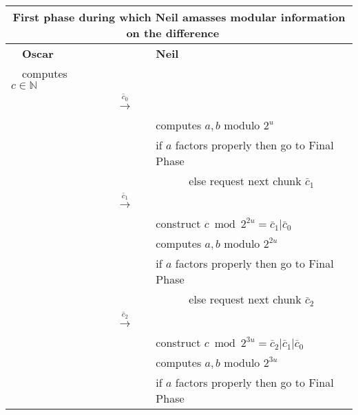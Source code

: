 \documentclass[11pt]{llncs}
\begin{document}
\begin{center}
\begin{tabular}{|lcl|}\hline
\multicolumn{3}{|c|}{{\sf First phase during which Neil amasses modular information on the difference~~}} \\\hline
~~{\bf Oscar}                      &                                                      &   {\bf Neil}~\\
~~computes $c\in \mathbb{N}$       &                                                      &\\
                                   &~~{{\LARGE $\stackrel{\bar{c}_0}{\longrightarrow}$}}~~&   \\
                                   &                                                      &computes $a,b$ modulo $2^u$~\\
                                   &                                                      &if $a$ factors properly then go to {\sf Final Phase}~~\\
                                   &                                                      &~~~~~~else request next chunk $\bar{c}_1$~~\\
                                   &~~{{\LARGE $\stackrel{\bar{c}_1}{\longrightarrow}$}}~~&   \\
                                   &                                                      &construct $c \bmod 2^{2u}=\bar{c}_1|\bar{c}_0$~~\\
                                   &                                                      &computes $a,b$ modulo $2^{2u}$~\\
                                   &                                                      &if $a$ factors properly then go to {\sf Final Phase}~~\\
                                   &                                                      &~~~~~~else request next chunk $\bar{c}_2$~~\\
                                   &~~{{\LARGE $\stackrel{\bar{c}_2}{\longrightarrow}$}}~~      &   \\
                                   &                                                      &construct $c\bmod 2^{3u}=\bar{c}_2|\bar{c}_1|\bar{c}_0$~~\\
                                   &                                                      &computes $a,b$ modulo $2^{3u}$~\\
                                   &                                                      &if $a$ factors properly then go to {\sf Final Phase}~~\\

\end{tabular}
\end{center}
\end{document}
